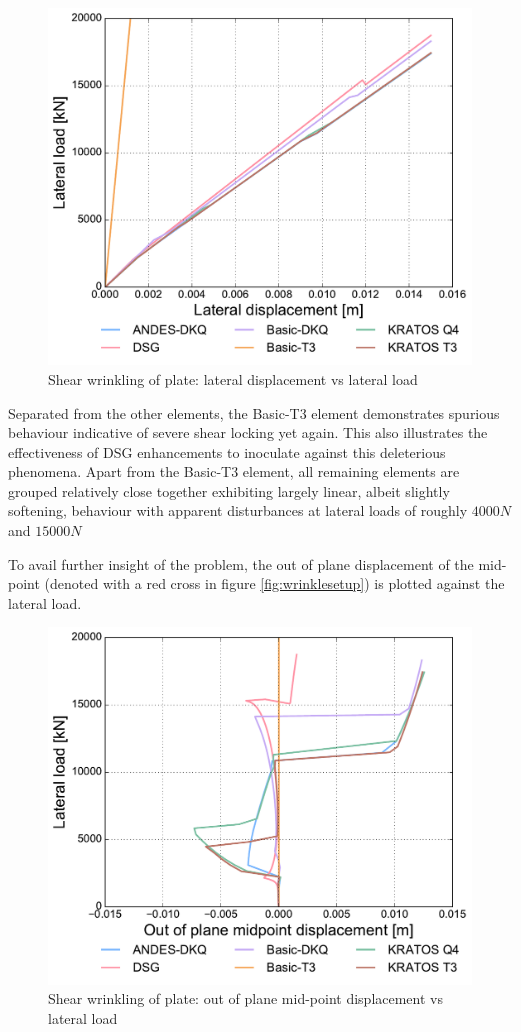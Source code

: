 \begin{figure}[H]
	\centering
	\def\svgwidth{\columnwidth}
	\includegraphics[width=12cm]{images/stability_wrinkle_axial_disp.pdf}
	\caption{Shear wrinkling of plate: lateral displacement vs lateral load}
	\label{pic:wrinkle1}
\end{figure}

Separated from the other elements, the Basic-T3 element demonstrates spurious behaviour indicative of severe shear locking yet again. This also illustrates the effectiveness of DSG enhancements to inoculate against this deleterious phenomena. Apart from the Basic-T3 element, all remaining elements are grouped relatively close together exhibiting largely linear, albeit slightly softening, behaviour with apparent disturbances at lateral loads of roughly $4000N$ and $15000N$

To avail further insight of the problem, the out of plane displacement of the mid-point (denoted with a red cross in figure \ref{fig:wrinklesetup}) is plotted against the lateral load.

\begin{figure}[H]
	\centering
	\def\svgwidth{\columnwidth}
	\includegraphics[width=12cm]{images/stability_wrinkle_pointtrans_disp.pdf}
	\caption{Shear wrinkling of plate: out of plane mid-point displacement vs lateral load}
	\label{pic:wrinkle2}
\end{figure}

